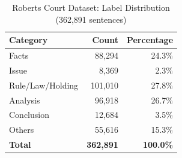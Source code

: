 \begin{table}[h]
\centering
\caption{Roberts Court Dataset: Label Distribution (362,891 sentences)}
\label{tab:roberts_distribution}
\begin{tabular}{lrr}
\toprule
\textbf{Category} & \textbf{Count} & \textbf{Percentage} \\
\midrule
Facts & 88,294 & 24.3\% \\
Issue & 8,369 & 2.3\% \\
Rule/Law/Holding & 101,010 & 27.8\% \\
Analysis & 96,918 & 26.7\% \\
Conclusion & 12,684 & 3.5\% \\
Others & 55,616 & 15.3\% \\
\midrule
\textbf{Total} & \textbf{362,891} & \textbf{100.0\%} \\
\bottomrule
\end{tabular}
\end{table}
